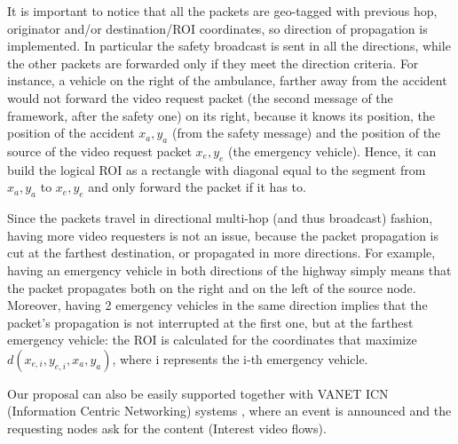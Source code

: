 \documentclass{acm_proc_article-sp}
\begin{document}
It is important to notice that all the packets are geo-tagged with previous hop, originator and/or destination/ROI coordinates, so direction of propagation is implemented. In particular the safety broadcast is sent in all the directions, while the other packets are forwarded only if they meet the direction criteria. For instance, a vehicle on the right of the ambulance, farther away from the accident would not forward the video request packet (the second message of the framework, after the safety one) on its right, because it knows its position, the position of the accident $x_{a},y_{a}$ (from the safety message) and the position of the source of the video request packet $x_{e},y_{e}$ (the emergency vehicle). Hence, it can build the logical ROI as a rectangle with diagonal equal to the segment from $x_{a},y_{a}$ to $x_{e},y_{e}$ and only forward the packet if it has to.

Since the packets travel in directional multi-hop (and thus broadcast) fashion, having more video requesters is not an issue, because the packet propagation is cut at the farthest destination, or propagated in more directions. For example, having an emergency vehicle in both directions of the highway simply means that the packet propagates both on the right and on the left of the source node. Moreover, having 2 emergency vehicles in the same direction implies that the packet's propagation is not interrupted at the first one, but at the farthest emergency vehicle: the ROI is calculated for the coordinates that maximize $d(x_{e,i},y_{e,i},x_{a},y_{a})$, where i represents the i-th emergency vehicle.


Our proposal can also be easily supported together with VANET ICN (Information Centric Networking) systems \cite{QualityEstimator}, where an event is announced and the requesting nodes ask for the content (Interest video flows).
\end{document}
